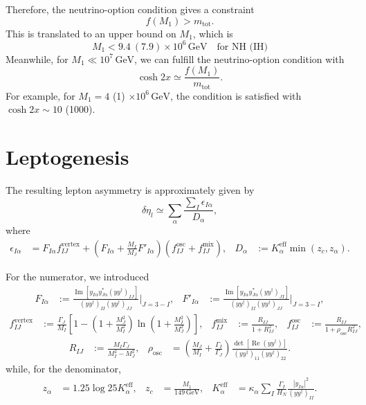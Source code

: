 \documentclass[a4paper,11pt,captions=tableheading,DIV=12]{scrartcl}
\numberwithin{equation}{section}
\newcommand\w[1]{_{\mathrm{#1}}}
\newcommand\unit[1]{\,\mathrm{#1}\xspace}
\newcommand\GeV{\unit{GeV}}
\renewcommand{\Re}{\mathop{\mathrm{Re}}}
\renewcommand{\Im}{\mathop{\mathrm{Im}}}
\newcommand\mtot{m_{\mathrm{tot}}}
\begin{document}
Therefore, the neutrino-option condition gives a constraint
\begin{equation}
 f(M_1) > \mtot.
\end{equation}
This is translated to an upper bound on $M_1$, which is
\begin{equation}
 M_1<9.4\ (7.9)\times10^6\GeV\quad\text{for NH (IH)}
\end{equation}
Meanwhile, for $M_1\ll10^7\GeV$, we can fulfill the neutrino-option condition with
\begin{equation}
 \cosh2x\simeq \frac{f(M_1)}{\mtot}.
\end{equation}
For example, for $M_1=4$ (1) $\times10^6\GeV$, the condition is satisfied with $\cosh2x \sim 10$ (1000).


\section{Leptogenesis}
The resulting lepton asymmetry is approximately given by
\begin{equation}
  \delta \eta_l\simeq
\sum_{\alpha}\frac{\sum_I\epsilon_{I\alpha}}{D_\alpha},
\end{equation}
where
\begin{align}
  \epsilon_{I\alpha} &= F_{I\alpha}f^{\mathrm{vertex}}_{IJ}+\left(
F_{I\alpha} + \frac{M_I}{M_J}F'_{I\alpha}
\right)(f^{\mathrm{osc}}_{IJ} + f^{\mathrm{mix}}_{IJ}),
&
  D_\alpha &:= K_\alpha^{\text{eff}}\min(z_c, z_\alpha).
\end{align}

For the numerator, we introduced
\begin{align*}
 F_{I\alpha} &:= \frac{\Im\left[y_{I\alpha}y^*_{J\alpha}(y y^\dagger)_{IJ}\right]}
{(y y^\dagger)_{II}(y y^\dagger)_{JJ}}\Bigg|_{J=3-I},
&
 F'_{I\alpha} &:= \frac{\Im\left[y_{I\alpha}y^*_{J\alpha}(y y^\dagger)_{JI}\right]}
{(y y^\dagger)_{II}(y y^\dagger)_{JJ}}\Bigg|_{J=3-I},
\end{align*}
\begin{align*}
 f^{\text{vertex}}_{IJ}
&:= \frac{\Gamma_J}{M_I}
\left[1-\left(1+\frac{M_J^2}{M_I^2}\right)\ln\left(1+\frac{M_I^2}{M_J^2}\right)\right],
&
 f^{\text{mix}}_{IJ}
&:= \frac{R_{IJ}}
         {1+R_{IJ}^2},&
 f^{\text{osc}}_{IJ}
&:= \frac{R_{IJ}}
         {1+\rho\w{osc} R_{IJ}^2},
\end{align*}
\begin{align*}
  R_{IJ} &:= \frac{M_I\Gamma_J}{M_I^2-M_J^2},
&
 \rho\w{osc} &
= \left(\frac{M_J}{M_I} + \frac{\Gamma_I}{\Gamma_J}\right)
\frac{\det\left[\Re(yy^\dagger)\right]}{(yy^\dagger)_{11}(yy^\dagger)_{22}}.
\end{align*}
while, for the denominator,
\begin{align*}
 z_\alpha &= 1.25\log25 K_\alpha^{\mathrm{eff}},&
 z_c &= \frac{M_1}{149\GeV},
&
 K_\alpha^{\mathrm{eff}}
&= \kappa_\alpha \sum_I \frac{\Gamma_I}{H_N}\frac{|y_{I\alpha}|^2}{(yy^\dagger)_{II}}.
\end{align*}
\end{document}
